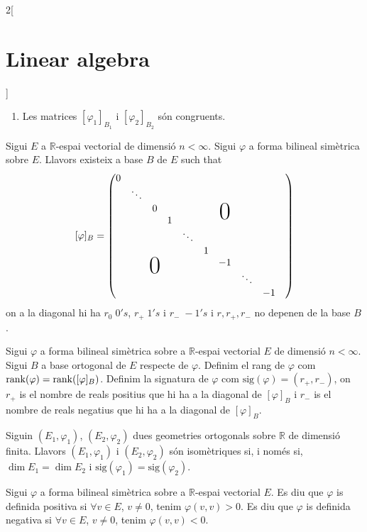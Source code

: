\documentclass[../../../main.tex]{subfiles}
\begin{document}
\begin{multicols}{2}[\section{Linear algebra}]
\begin{prop}
\begin{enumerate}
    \item Les matrices $[\varphi_1]_{B_1}$ i $[\varphi_2]_{B_2}$ són congruents.
\end{enumerate}
\end{prop}
\begin{theorem}
Sigui $E$ a $\mathbb{R}$-espai vectorial de dimensió $n<\infty$. Sigui $\varphi$ a forma bilineal simètrica sobre $E$. Llavors existeix a base $B$ de $E$ such that $$[\varphi]_B=\begin{pmatrix}
0 &&&&&&&&&\\
& \ddots&&&&&&&\\
&& 0&&&&\bigzero&&\\
&&& 1 &&&&&\\
&&&& \ddots &&&&\\
&&&&& 1 &&&\\
&&\bigzero&&&& -1 &&\\
&&&&&&&\ddots &\\
&&&&&&&& -1
\end{pmatrix}$$
on a la diagonal hi ha $r_0\;0's$, $r_+\;1's$ i $r_-\;-1's$ i $r,r_+,r_-$ no depenen de la base $B$.
\end{theorem}
\begin{definition}
Sigui $\varphi$ a forma bilineal simètrica sobre a $\mathbb{R}$-espai vectorial $E$ de dimensió $n<\infty$. Sigui $B$ a base ortogonal de $E$ respecte de $\varphi$. Definim el rang de $\varphi$ com $\rank (\varphi)=\rank ([\varphi]_B)$. Definim la signatura de $\varphi$ com $\text{sig}(\varphi)=(r_+,r_-)$, on $r_+$ is el nombre de reals positius que hi ha a la diagonal de $[\varphi]_B$ i $r_-$ is el nombre de reals negatius que hi ha a la diagonal de $[\varphi]_B$.
\end{definition}
\begin{theorem}
Siguin $(E_1,\varphi_1)$, $(E_2,\varphi_2)$ dues geometries ortogonals sobre $\mathbb{R}$ de dimensió finita. Llavors $(E_1,\varphi_1)$ i $(E_2,\varphi_2)$ són isomètriques si, i només si, $\dim E_1=\dim E_2$ i $\text{sig}(\varphi_1)=\text{sig}(\varphi_2)$.
\end{theorem}
\begin{definition}
Sigui $\varphi$ a forma bilineal simètrica sobre a $\mathbb{R}$-espai vectorial $E$. Es diu que $\varphi$ is definida positiva si $\forall v\in E$, $v\ne 0$, tenim $\varphi(v,v)>0$. Es diu que $\varphi$ is definida negativa si $\forall v\in E$, $v\ne 0$, tenim $\varphi(v,v)<0$. 
\end{definition}

\end{multicols}
\end{document}

